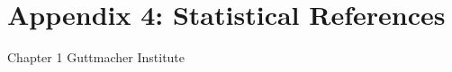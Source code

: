 \chapter{Appendix 4: Statistical References}\label{app:bibliography}

Chapter 1
Guttmacher Institute


